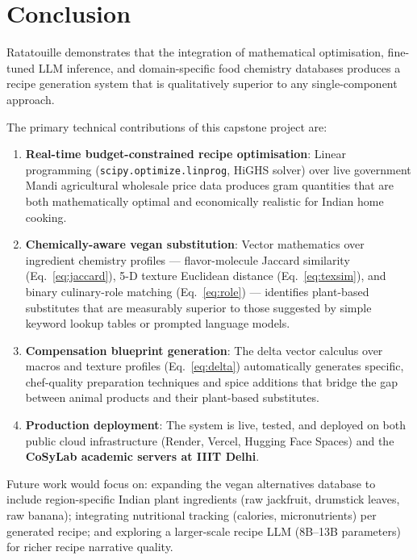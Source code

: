 \documentclass[12pt, a4paper]{article}
\begin{document}
\section{Conclusion}

Ratatouille demonstrates that the integration of mathematical optimisation, fine-tuned LLM
inference, and domain-specific food chemistry databases produces a recipe generation system
that is qualitatively superior to any single-component approach.

The primary technical contributions of this capstone project are:

\begin{enumerate}
  \item \textbf{Real-time budget-constrained recipe optimisation}: Linear programming (\texttt{scipy.optimize.linprog}, HiGHS solver) over live government Mandi agricultural wholesale price data produces gram quantities that are both mathematically optimal and economically realistic for Indian home cooking.

  \item \textbf{Chemically-aware vegan substitution}: Vector mathematics over ingredient chemistry profiles --- flavor-molecule Jaccard similarity (Eq.~\ref{eq:jaccard}), 5-D texture Euclidean distance (Eq.~\ref{eq:texsim}), and binary culinary-role matching (Eq.~\ref{eq:role}) --- identifies plant-based substitutes that are measurably superior to those suggested by simple keyword lookup tables or prompted language models.

  \item \textbf{Compensation blueprint generation}: The delta vector calculus over macros and texture profiles (Eq.~\ref{eq:delta}) automatically generates specific, chef-quality preparation techniques and spice additions that bridge the gap between animal products and their plant-based substitutes.

  \item \textbf{Production deployment}: The system is live, tested, and deployed on both public cloud infrastructure (Render, Vercel, Hugging Face Spaces) and the \textbf{CoSyLab academic servers at IIIT Delhi}.
\end{enumerate}

Future work would focus on: expanding the vegan alternatives database to include region-specific
Indian plant ingredients (raw jackfruit, drumstick leaves, raw banana); integrating nutritional
tracking (calories, micronutrients) per generated recipe; and exploring a larger-scale recipe
LLM (8B--13B parameters) for richer recipe narrative quality.
\end{document}
